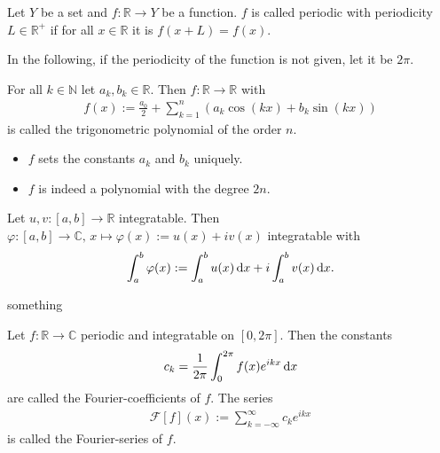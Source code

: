 \begin{definition}
    Let \(Y\) be a set and \(f: \mathbb{R} \rightarrow Y\) be a function. \(f\) is called periodic with periodicity \(L \in \mathbb{R}^+\) if for all \(x \in \mathbb{R}\) it is \(f(x + L) = f(x)\).
\end{definition}
\begin{remark}
    In the following, if the periodicity of the function is not given, let it be \(2\pi\).
\end{remark}
\begin{definition}
    For all \(k \in \mathbb{N}\) let \(a_k, b_k \in \mathbb{R}\). Then \(f: \mathbb{R} \rightarrow \mathbb{R}\) with
    \begin{align}
        f(x) := \frac{a_0}{2} + \sum_{k = 1}^n (a_k \cos(kx) + b_k \sin(kx))
    \end{align}
    is called the trigonometric polynomial of the order \(n\).
\end{definition}
\begin{remark}
    \begin{itemize}
        \item \(f\) sets the constants \(a_k\) and \(b_k\) uniquely.
        \item \(f\) is indeed a polynomial with the degree \(2n\).
    \end{itemize}
\end{remark}
\begin{definition}
    Let \(u, v: [a, b] \rightarrow \mathbb{R}\) integratable. Then \(\varphi: [a, b] \rightarrow \mathbb{C}, \, x \mapsto \varphi(x) := u(x) + iv(x)\) integratable with
    \begin{align}
        \int_a^b \varphi(x) := \int_a^b u(x) \mathop{}\!\mathrm{d} x + i \int_a^b v(x) \mathop{}\!\mathrm{d} x \text{.}
    \end{align}
\end{definition}
\begin{theorem}
    something
\end{theorem}
%
\begin{definition}
    Let \(f: \mathbb{R} \rightarrow \mathbb{C}\) periodic and integratable on \([0, 2\pi]\). Then the constants
    \begin{align}
        c_k = \frac{1}{2\pi} \int_0^{2\pi} f(x) e^{ikx} \mathop{}\!\mathrm{d} x 
    \end{align}
    are called the Fourier-coefficients of \(f\). The series
    \begin{align}
        \mathcal{F}[f](x) := \sum_{k = -\infty}^\infty c_k e^{ikx}
    \end{align}
    is called the Fourier-series of \(f\).
\end{definition}